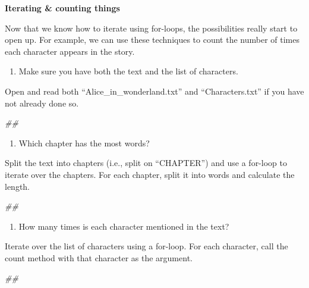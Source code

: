 \documentclass[]{book}
\newenvironment{Shaded}{\begin{snugshade}}{\end{snugshade}}
\newcommand{\CommentTok}[1]{\textcolor[rgb]{0.56,0.35,0.01}{\textit{#1}}}
\providecommand{\tightlist}{%
  \setlength{\itemsep}{0pt}\setlength{\parskip}{0pt}}
\begin{document}
\textbf{Iterating \& counting things}

Now that we know how to iterate using for-loops, the possibilities really start to open up. For example, we can use these techniques to count the number of times each character appears in the story.

\begin{enumerate}
\def\labelenumi{\arabic{enumi}.}
\tightlist
\item
  Make sure you have both the text and the list of characters.
\end{enumerate}

Open and read both ``Alice\_in\_wonderland.txt'' and
``Characters.txt'' if you have not already done so.

\begin{Shaded}
\begin{Highlighting}[]
\CommentTok{##}
\end{Highlighting}
\end{Shaded}

\begin{enumerate}
\def\labelenumi{\arabic{enumi}.}
\setcounter{enumi}{1}
\tightlist
\item
  Which chapter has the most words?
\end{enumerate}

Split the text into chapters (i.e., split on ``CHAPTER'') and use a for-loop to iterate over the chapters.
For each chapter, split it into words and calculate the length.

\begin{Shaded}
\begin{Highlighting}[]
\CommentTok{##}
\end{Highlighting}
\end{Shaded}

\begin{enumerate}
\def\labelenumi{\arabic{enumi}.}
\setcounter{enumi}{2}
\tightlist
\item
  How many times is each character mentioned in the text?
\end{enumerate}

Iterate over the list of characters using a for-loop.
For each character, call the count method with that character as the argument.

\begin{Shaded}
\begin{Highlighting}[]
\CommentTok{##}
\end{Highlighting}
\end{Shaded}
\end{document}
